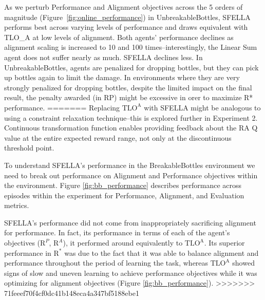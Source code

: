As we perturb Performance and Alignment objectives across the 5 orders of magnitude (Figure~\ref{fig:online_performance}) in UnbreakableBottles, SFELLA performs best across varying levels of performance and draws equivalent with TLO\_A at low levels of alignment. Both agents' performance declines as alignment scaling is increased to 10 and 100 times--interestingly, the Linear Sum agent does not suffer nearly as much. SFELLA declines less. In UnbreakableBottles, agents are penalized for dropping bottles, but they can pick up bottles again to limit the damage. In environments where they are very strongly penalized for dropping bottles, despite the limited impact on the final result, the penalty awarded (in RP) might be excessive in orer to maximize R* performance.
=======
Replacing $\text{TLO}^\text{A}$ with SFELLA might be analogous to using a constraint relaxation technique--this is explored further in Experiment 2. %
Continuous transformation function enables providing feedback about the RA Q value at the entire expected reward range, not only at the discontinuous threshold point.

To understand SFELLA's performance in the BreakableBottles environment we need to break out performance on Alignment and Performance objectives within the environment. Figure \ref{fig:bb_performance} describes performance across episodes within the experiment for Performance, Alignment, and Evaluation metrics.

SFELLA's performance did not come from inappropriately sacrificing alignment for performance. In fact, its performance in terms of each of the agent's objectives ($\text{R}^P$, $\text{R}^A$), it performed around equivalently to $\text{TLO}^\text{A}$. Its superior performance in $\text{R}^*$ was due to the fact that it was able to balance alignment and performance throughout the period of learning the task, whereas $\text{TLO}^\text{A}$ showed signs of slow and uneven learning to achieve performance objectives while it was optimizing for alignment objectives (Figure \ref{fig:bb_performance}).
>>>>>>> 71feeef70f4cf0dc41b148eca4a347bf5188ebe1

